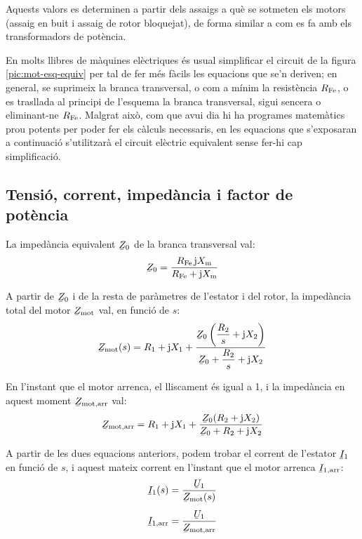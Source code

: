 Aquests valors es determinen a partir dels assaigs a què se sotmeten els motors (assaig en buit i assaig de rotor bloquejat), de forma similar a com es fa amb els transformadors de potència.

En molts llibres de màquines elèctriques és usual simplificar el circuit de la figura  \vref{pic:mot-esq-equiv} per tal de fer més fàcils les equacions que se'n deriven; en general, se suprimeix la branca transversal, o com a mínim la resistència $R_\mathrm{Fe}$, o es trasllada al principi de l'esquema la branca transversal, sigui sencera o eliminant-ne  $R_\mathrm{Fe}$. Malgrat això, com que avui dia hi ha programes matemàtics prou potents per poder fer els càlculs necessaris, en les equacions que s'exposaran a continuació s'utilitzarà el circuit elèctric equivalent sense fer-hi cap simplificació.

\subsection{Tensió, corrent, impedància i factor de potència}\label{sec:mot-u-c-i}

La impedància equivalent $\cmplx{Z}_0$ de la branca transversal val:
\begin{equation}\label{eq:mot-Z0}
    \cmplx{Z}_0 = \frac{R\ped{Fe} \, \ju X\ped{m}}{ R\ped{Fe} + \ju X\ped{m}}
\end{equation}

A partir de $\cmplx{Z}_0$ i de la resta de paràmetres de l'estator i del rotor, la impedància total del motor $\cmplx{Z}\ped{mot}$ val,  en funció de $s$:
\begin{equation}\label{eq:mot-Zmot}\index{motors d'inducció!impedància}
    \cmplx{Z}\ped{mot}(s) = R_1 + \ju X_1 + \frac{\cmplx{Z}_0 \left( \dfrac{R_2}{s} + \ju X_2\right)}{\cmplx{Z}_0 +  \dfrac{R_2}{s} + \ju X_2}
\end{equation}

En l'instant que el motor arrenca, el lliscament és igual a 1, i la impedància en aquest moment $\cmplx{Z}\ped{mot,arr}$ val:
\begin{equation}\label{eq:z-mot-arr}
    \cmplx{Z}\ped{mot,arr} = R_1 + \ju X_1 + \frac{\cmplx{Z}_0 ( R_2 + \ju X_2)}{\cmplx{Z}_0 +  R_2 + \ju X_2}
\end{equation}

A partir de les dues equacions anteriors, podem trobar el corrent de l'estator  $\cmplx{I}_1$ en funció de $s$, i aquest mateix corrent en l'instant que el motor arrenca $\cmplx{I}\ped{1,arr}$:
\begin{subequations}\index{motors d'inducció!corrent d'arrencada}\index{motors d'inducció!corrent}
\begin{align}
    \cmplx{I}_1(s) &= \frac{\cmplx{U}_1}{\cmplx{Z}\ped{mot}(s)}\label{eq:I1-mot} \\[1ex]
    \cmplx{I}\ped{1,arr} &= \frac{\cmplx{U}_1}{\cmplx{Z}\ped{mot,arr}}\label{eq:I1-mot-arr}
\end{align}
\end{subequations}

